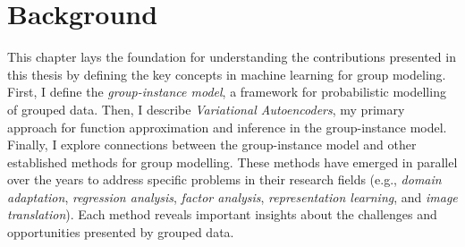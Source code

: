 \documentclass[../thesis.tex]{subfiles}
\begin{document}
\chapter{Background}

This chapter lays the foundation for understanding the contributions presented in this thesis by defining the key concepts in machine learning for group modeling. First, I define the \textit{group-instance model}, a framework for probabilistic modelling of grouped data. Then, I describe \textit{Variational Autoencoders}, my primary approach for function approximation and inference in the group-instance model. Finally, I explore connections between the group-instance model and other established methods for group modelling. These methods have emerged in parallel over the years to address specific problems in their research fields (e.g., \textit{domain adaptation}, \textit{regression analysis}, \textit{factor analysis}, \textit{representation learning}, and \textit{image translation}). Each method reveals important insights about the challenges and opportunities presented by grouped data.
\end{document}
